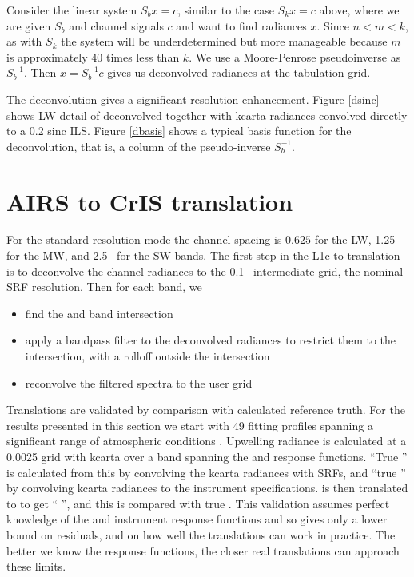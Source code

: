 \documentclass[12pt]{article}
\begin{document}
Consider the linear system $S_b x = c$, similar to the case 
$S_k x = c$ above, where we are given $S_b$ and channel signals $c$
and want to find radiances $x$.  Since $n < m < k$, as with $S_k$
the system will be underdetermined but more manageable because $m$
is approximately 40 times less than $k$.  We use a Moore-Penrose
pseudoinverse as $S_b^{-1}$.  Then $x = S_b^{-1} c$ gives us
deconvolved radiances at the {\srf} tabulation grid. 

The {\airs} deconvolution gives a significant resolution enhancement.
Figure \ref{dsinc} shows LW detail of deconvolved {\airs} together
with kcarta radiances convolved directly to a 0.2 {\wn} sinc ILS.
Figure \ref{dbasis} shows a typical basis function for the {\airs}
deconvolution, that is, a column of the pseudo-inverse $S_b^{-1}$.

\FloatBarrier
\section{AIRS to CrIS translation}
\label{airs2cris}

For the {\cris} standard resolution mode the channel spacing is
$0.625$ {\wn} for the LW, 1.25~{\wn} for the MW, and 2.5~{\wn} for
the SW bands.  The first step in the {\airs} L1c to {\cris}
translation is to deconvolve the {\airs} channel radiances to the
0.1~{\wn} intermediate grid, the nominal {\airs} SRF resolution.
Then for each {\cris} band, we

\begin{itemize}
  \item find the {\airs} and {\cris} band intersection

  \item apply a bandpass filter to the deconvolved {\airs} radiances
    to restrict them to the intersection, with a rolloff outside the
    intersection

  \item reconvolve the filtered spectra to the {\cris} user grid

\end{itemize}

Translations are validated by comparison with calculated reference
truth.  For the results presented in this section we start with 49
fitting profiles spanning a significant range of atmospheric
conditions \cite{sarta1,sarta2}.  Upwelling radiance is calculated
at a 0.0025 {\wn} grid with kcarta \cite{kcarta1} over a band
spanning the {\airs} and {\cris} response functions.  ``True
{\airs}'' is calculated from this by convolving the kcarta radiances
with {\airs} SRFs, and ``true {\cris}'' by convolving kcarta
radiances to the {\cris} instrument specifications.  {\airs} is then
translated to {\cris} to get ``{\airs} {\cris}'', and this is
compared with true {\cris}.  This validation assumes perfect
knowledge of the {\airs} and {\cris} instrument response functions
and so gives only a lower bound on residuals, and on how well the
translations can work in practice.  The better we know the response
functions, the closer real translations can approach these limits.
\end{document}
